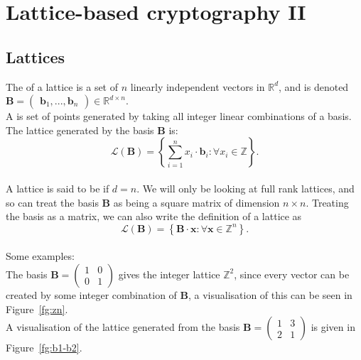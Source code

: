 \documentclass[a4paper, 11pt, openany]{book}
\begin{document}



\section{Lattice-based cryptography II}
\label{sec:20}

\subsection{Lattices}
The  of a lattice is a set of $n$ linearly independent vectors in $\mathbb{R}^d$, and is denoted $\textbf{B} = \begin{pmatrix}\textbf{b}_1,...,\textbf{b}_n\end{pmatrix} \in \mathbb{R}^{d\times n}$.
\\
A  is set of points generated by taking all integer linear combinations of a basis. The lattice generated by the basis $\textbf{B}$ is: $$\mathcal{L}(\textbf{B}) = \left\{\sum_{i = 1}^{n}x_{i}\cdot\textbf{b}_{i}:\forall x_{i}\in\mathbb{Z}\right\}.$$
\\
A lattice is said to be  if $d = n$. We will only be looking at full rank lattices, and so can treat the basis $\textbf{B}$ as being a square matrix of dimension $n\times n$. Treating the basis as a matrix, we can also write the definition of a lattice as $$\mathcal{L}(\textbf{B}) = \left\{ \textbf{B}\cdot\textbf{x}:\forall\textbf{x}\in\mathbb{Z}^{n}\right\}.$$
\\
Some examples:
\\
The basis $\textbf{B} = \begin{pmatrix}1 & 0 \\ 0 & 1 \end{pmatrix}$ gives the integer lattice $\mathbb{Z}^2$, since every vector can be created by some integer combination of $\textbf{B}$, a visualisation of this can be seen in Figure~\ref{fg:zn}.
\\
A visualisation of the lattice generated from the basis $\textbf{B} = \begin{pmatrix}1 & 3 \\ 2 & 1\end{pmatrix}$ is given in Figure~\ref{fg:b1-b2}.
\end{document}
